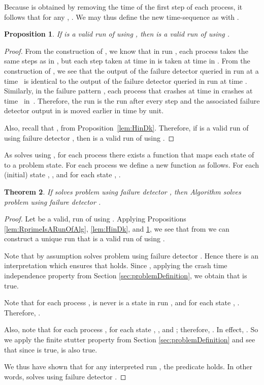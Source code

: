 \documentclass[11pt]{article}
\newtheorem{proposition}{Proposition}[section]
\newtheorem{theorem}[proposition]{Theorem}
\begin{document}
Because  is obtained by removing the time of the first step of each
     process, it follows that for any , .
We may thus define the new time-sequence  as 
     with .


\begin{proposition}\label{lem:RIsAValidRun}
If  is a
     valid run of  using , then  is a valid run of  using .
\end{proposition}
\begin{proof}
From the construction of , we know that in run , each process
      takes the same steps as in , but each step taken
     at time  in  is taken at time  in .
From the construction of , we see that the output of the failure
     detector queried in run  at a time~ is identical to the
     output of the failure detector queried in run  at time .
Similarly, in the failure pattern , each process that crashes at time
      in  crashes at time~ in~.
Therefore, the run  is the run  after every step and the
     associated failure detector output in  is moved earlier in
     time by  unit.

Also, recall that  , from Proposition~\ref{lem:HinDk}.
Therefore, if  is a valid run of  using failure detector
     , then  is a valid run of  using .
\end{proof}
 

As  solves  using , for each process 
     there exists a function  that maps each state of  to a
     problem state.
For each process  we define a new function  as
     follows.
For each (initial) state , , and for each state  ,
     .


\begin{theorem}
If  solves problem  using failure detector ,
     then Algorithm  solves problem  using failure
     detector .
\end{theorem}
\begin{proof}
Let  be a
     valid, run of  using .
Applying Propositions \ref{lem:RprimeIsARunOfAlg}, \ref{lem:HinDk},
     and \ref{lem:RIsAValidRun}, we see that from  we
     can construct a unique run 
     that is a valid run of  using .

Note that by assumption  solves problem  using failure
     detector .
Hence there is an interpretation  which ensures that
      holds.
Since , applying the crash time independence
     property from Section \ref{sec:problemDefinition}, we obtain that
      is true.

Note that for each process ,  is never is a state  in run , and for each state  ,
     .
Therefore, .

Also, note that for each process , for each state , , and
     ; therefore,
     .
In effect, .
So we apply the finite stutter property from  Section
     \ref{sec:problemDefinition} and see that since
      is true,
      is also true.

We thus have shown that for any interpreted run ,
     the predicate  holds.
In other words,    solves   using
     failure detector .
\end{proof}
\end{document}
